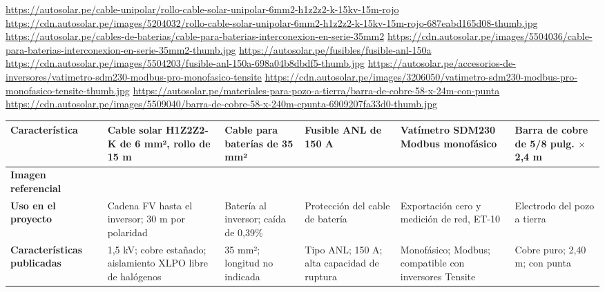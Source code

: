 \begin{landscape}
\urldef{\cotueb}\url{https://autosolar.pe/cable-unipolar/rollo-cable-solar-unipolar-6mm2-h1z2z2-k-15kv-15m-rojo}
\urldef{\cotuec}\url{https://cdn.autosolar.pe/images/5204032/rollo-cable-solar-unipolar-6mm2-h1z2z2-k-15kv-15m-rojo-687eabd165d08-thumb.jpg}
\urldef{\cotued}\url{https://autosolar.pe/cables-de-baterias/cable-para-baterias-interconexion-en-serie-35mm2}
\urldef{\cotuee}\url{https://cdn.autosolar.pe/images/5504036/cable-para-baterias-interconexion-en-serie-35mm2-thumb.jpg}
\urldef{\cotuef}\url{https://autosolar.pe/fusibles/fusible-anl-150a}
\urldef{\cotueg}\url{https://cdn.autosolar.pe/images/5504203/fusible-anl-150a-698a04b8dbdf5-thumb.jpg}
\urldef{\cotueh}\url{https://autosolar.pe/accesorios-de-inversores/vatimetro-sdm230-modbus-pro-monofasico-tensite}
\urldef{\cotuei}\url{https://cdn.autosolar.pe/images/3206050/vatimetro-sdm230-modbus-pro-monofasico-tensite-thumb.jpg}
\urldef{\cotuej}\url{https://autosolar.pe/materiales-para-pozo-a-tierra/barra-de-cobre-58-x-24m-con-punta}
\urldef{\cotuek}\url{https://cdn.autosolar.pe/images/5509040/barra-de-cobre-58-x-240m-cpunta-6909207fa33d0-thumb.jpg}
\par\noindent\begin{minipage}{\linewidth}\formatofichas
{}\label{tab:cot-u1}
\begin{tabularx}{\linewidth}{@{}>{\raggedright\arraybackslash}p{3.0cm}YYYYY@{}}
\toprule
\textbf{Característica} & \textbf{Cable solar H1Z2Z2-K de 6 mm², rollo de 15 m} & \textbf{Cable para baterías de 35 mm²} & \textbf{Fusible ANL de 150 A} & \textbf{Vatímetro SDM230 Modbus monofásico} & \textbf{Barra de cobre de 5/8 pulg. $\times$ 2,4 m}\\\midrule
\textbf{Imagen referencial} &  &  &  &  & \\
\textbf{Uso en el proyecto} & Cadena FV hasta el inversor; 30 m por polaridad & Batería al inversor; caída de 0,39\% & Protección del cable de batería & Exportación cero y medición de red, ET-10 & Electrodo del pozo a tierra\\
\textbf{Características publicadas} & 1,5 kV; cobre estañado; aislamiento XLPO libre de halógenos & 35 mm²; longitud no indicada & Tipo ANL; 150 A; alta capacidad de ruptura & Monofásico; Modbus; compatible con inversores Tensite & Cobre puro; 2,40 m; con punta\\

\end{tabularx}
\end{minipage}
\end{landscape}

